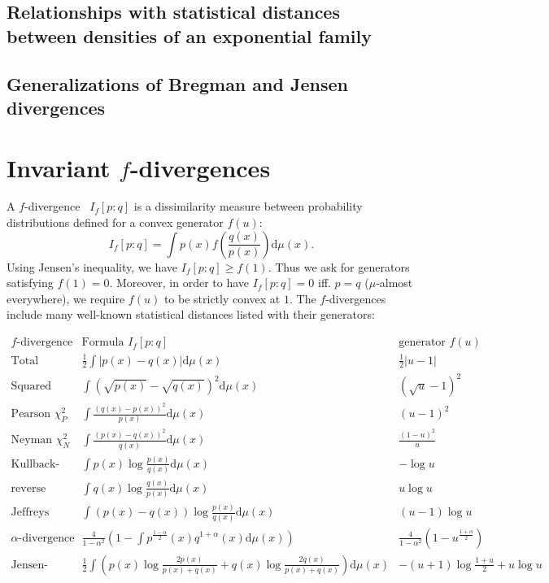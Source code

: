 \documentclass[11pt]{article}
\def\dmu{\mathrm{d}\mu}
\def\dmu{\mathrm{d}\mu}
\begin{document}
\subsection{Relationships with statistical distances between densities of an exponential family}

\subsection{Generalizations of Bregman and Jensen divergences}




\section{Invariant {\protect $f$-divergences}}

A $f$-divergence~\cite{Morimoto-1963,EN-PhD-Csiszar-1967,fdiv-AliSilvey-1966,Csiszar-1972} $I_f[p:q]$ is a dissimilarity measure between probability distributions defined for a convex generator $f(u)$:
$$
I_f[p:q]=\int p(x) f\left(\frac{q(x)}{p(x)}\right) \dmu(x).
$$
Using Jensen's inequality, we have $I_f[p:q]\geq f(1)$. Thus we ask for generators satisfying $f(1)=0$.
Moreover, in order to have $I_f[p:q]=0$ iff. $p=q$ ($\mu$-almost everywhere), we require $f(u)$ to be strictly convex at $1$.
The $f$-divergences include many well-known statistical distances listed with their generators: %

\begin{center}
$
\begin{array}{lll}
\text{$f$-divergence } & \text{Formula $I_f[p:q]$} & \text{generator $f(u)$}\\
\hline\hline
\text{Total variation (metric)} & \frac{1}{2}\int |p(x)-q(x)| \dmu(x) & \frac{1}{2} |u-1| \\
\text{Squared Hellinger} & \int (\sqrt{p(x)}-\sqrt{q(x)})^2 \dmu(x) & (\sqrt{u}-1)^2\\
\text{Pearson $\chi^2_P$}  &  \int \frac{(q(x)-p(x))^2}{p(x)} \dmu(x) & (u-1)^2\\
\text{Neyman $\chi^2_N$}  &  \int \frac{(p(x)-q(x))^2}{q(x)} \dmu(x) & \frac{(1-u)^2}{u}\\
\text{Kullback-Leibler} & \int p(x)\log \frac{p(x)}{q(x)} \dmu(x) & -\log u\\
\text{reverse Kullback-Leibler} & \int q(x)\log \frac{q(x)}{p(x)} \dmu(x) & u\log u \\
\text{Jeffreys divergence} &\int (p(x)-q(x))\log\frac{p(x)}{q(x)} \dmu(x) & (u-1)\log u\\
\text{$\alpha$-divergence} &  \frac{4}{1-\alpha^2} (1-\int p^{\frac{1-\alpha}{2}}(x) q^{1+\alpha}(x) \dmu(x))  & \frac{4}{1-\alpha^2}(1-u^{\frac{1+\alpha}{2}})\\ 
\text{Jensen-Shannon} & \frac{1}{2}\int (p(x)\log \frac{2p(x)}{p(x)+q(x)} +  q(x)\log \frac{2q(x)}{p(x)+q(x)})\dmu(x) 
&  -(u+1)\log \frac{1+u}{2} + u\log u\\
\end{array}
$
\end{center}
\end{document}
